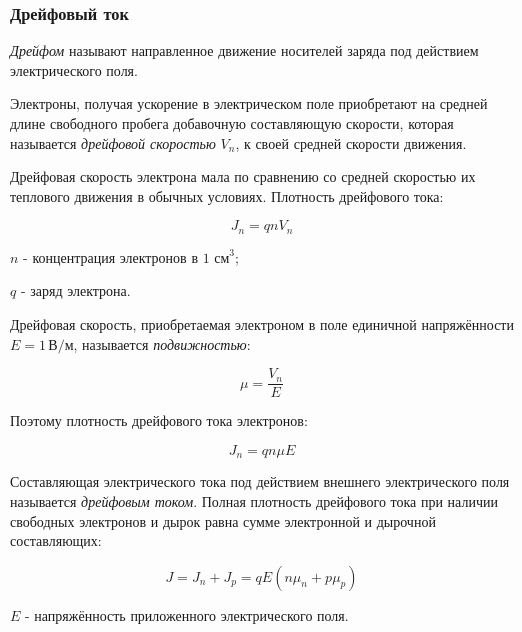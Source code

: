 	\subsubsection{Дрейфовый ток}
	
	\par \textit{Дрейфом} называют направленное движение носителей заряда под действием электрического поля.
	
	\par Электроны, получая ускорение в электрическом поле приобретают на средней длине свободного пробега добавочную составляющую скорости, которая называется \textit{дрейфовой скоростью} \(V_n\), к своей средней скорости движения.
	
	\par Дрейфовая скорость электрона мала по сравнению со средней скоростью их теплового движения в обычных условиях. Плотность дрейфового тока:
	
	\begin{equation}
	    J_n = qnV_n
	\end{equation}
	
	\(n\) - \(\text{концентрация электронов в 1 см}^3\);
	\par \(q\) - заряд электрона.\\
	
	\par Дрейфовая скорость, приобретаемая электроном в поле единичной напряжённости $E = 1 \, \text{В/м}$, называется \textit{подвижностью}:
	
	\begin{equation}
		\mu = \dfrac{V_n}{E}
	\end{equation}
	
	\par Поэтому плотность дрейфового тока электронов:
	
	\begin{equation}
		J_n = qn\mu E
	\end{equation}
	
	\par Составляющая электрического тока под действием внешнего электрического поля называется \textit{дрейфовым током}. Полная плотность дрейфового тока при наличии свободных электронов и дырок равна сумме электронной и дырочной составляющих:
	
	\begin{equation}
		J = J_n + J_p = qE(n\mu_n + p\mu_p)
	\end{equation}
	
	\par \(E\) - напряжённость приложенного электрического поля.
	
